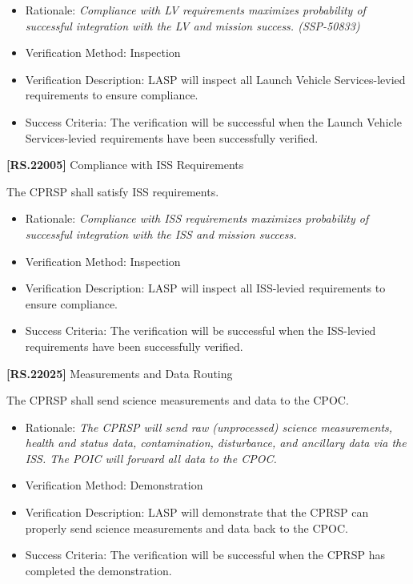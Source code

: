 \documentclass[12pt,oneside,oldfontcommands]{memoir}
\begin{document}
\begin{itemize}
\item{} Rationale: \emph{Compliance with LV requirements maximizes probability of successful integration with the LV and mission success. (SSP-50833)}

\item{} Verification Method: Inspection

\item{} Verification Description: \gls{LASP} will inspect all Launch Vehicle Services-levied requirements to ensure compliance.

\item{} Success Criteria: The verification will be successful when the Launch Vehicle Services-levied requirements have been successfully verified.

\end{itemize}

\textbf{[RS.22005]} Compliance with \gls{ISS} Requirements

The \gls{CPRSP} shall satisfy \gls{ISS} requirements.

\begin{itemize}
\item{} Rationale: \emph{Compliance with ISS requirements maximizes probability of successful integration with the ISS and mission success.}

\item{} Verification Method: Inspection

\item{} Verification Description: \gls{LASP} will inspect all \gls{ISS}-levied requirements to ensure compliance.

\item{} Success Criteria: The verification will be successful when the \gls{ISS}-levied requirements have been successfully verified.

\end{itemize}

\textbf{[RS.22025]} Measurements and Data Routing

The \gls{CPRSP} shall send science \gls{measure}ments and data to the \gls{CPOC}.

\begin{itemize}
\item{} Rationale: \emph{The CPRSP will send raw (unprocessed) science measurements, health and status data, contamination, disturbance, and ancillary data via the ISS. The POIC will forward all data to the CPOC.}

\item{} Verification Method: Demonstration

\item{} Verification Description: \gls{LASP} will demonstrate that the \gls{CPRSP} can properly send science \gls{measure}ments and data back to the \gls{CPOC}.

\item{} Success Criteria: The verification will be successful when the \gls{CPRSP} has completed the \gls{demonstration}.

\end{itemize}
\end{document}
